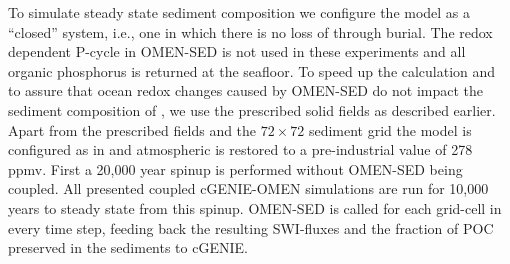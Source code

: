 \documentclass[gmd, manuscript]{copernicus}
\begin{document}
To simulate steady state sediment composition we configure the model as a ``closed'' system, i.e., one in which there is no loss of  through burial. The redox dependent P-cycle in OMEN-SED is not used in these experiments and 
all organic phosphorus is returned at the seafloor. To speed up the calculation and to assure that ocean redox changes caused by OMEN-SED do not impact the sediment composition of , we use the prescribed solid fields as described earlier. 
Apart from the prescribed fields and the $72\times 72$ sediment grid the model is configured as in \citet{archer_atmospheric_2009} and atmospheric  is restored to a pre-industrial value of 278 ppmv. 
First a 20,000 year spinup is performed without OMEN-SED being coupled. All presented coupled cGENIE-OMEN simulations are run for 10,000 years to steady state from this spinup. 
OMEN-SED is called for each grid-cell in every time step, feeding back the resulting SWI-fluxes and the fraction of POC preserved in the sediments to cGENIE. 
\end{document}
